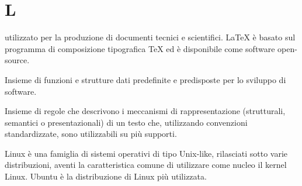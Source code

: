 \section{L}

 utilizzato per la produzione di documenti tecnici e scientifici.
\LaTeX{} è basato sul programma di composizione tipografica \TeX{} ed è disponibile come software open-source.

Insieme di funzioni e strutture dati predefinite e predisposte per lo sviluppo di software.

Insieme di regole che descrivono i meccanismi di rappresentazione (strutturali, semantici o presentazionali) di un testo che, utilizzando convenzioni standardizzate, sono utilizzabili su più supporti.

Linux è una famiglia di sistemi operativi di tipo Unix-like, rilasciati sotto varie distribuzioni, aventi la caratteristica comune di utilizzare come nucleo il kernel Linux. Ubuntu è la distribuzione di Linux più utilizzata.


